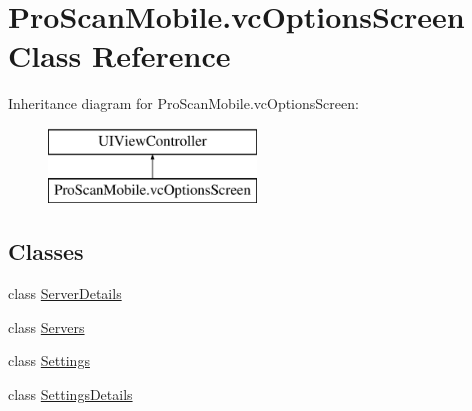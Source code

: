 \hypertarget{class_pro_scan_mobile_1_1vc_options_screen}{\section{Pro\-Scan\-Mobile.\-vc\-Options\-Screen Class Reference}
\label{class_pro_scan_mobile_1_1vc_options_screen}
}
Inheritance diagram for Pro\-Scan\-Mobile.\-vc\-Options\-Screen\-:\begin{figure}[H]
\begin{center}
\leavevmode
\includegraphics[height=2.000000cm]{class_pro_scan_mobile_1_1vc_options_screen}
\end{center}
\end{figure}
\subsection*{Classes}
\begin{DoxyCompactItemize}
\item 
class \hyperlink{class_pro_scan_mobile_1_1vc_options_screen_1_1_server_details}{Server\-Details}
\item 
class \hyperlink{class_pro_scan_mobile_1_1vc_options_screen_1_1_servers}{Servers}
\item 
class \hyperlink{class_pro_scan_mobile_1_1vc_options_screen_1_1_settings}{Settings}
\item 
class \hyperlink{class_pro_scan_mobile_1_1vc_options_screen_1_1_settings_details}{Settings\-Details}
\end{DoxyCompactItemize}
